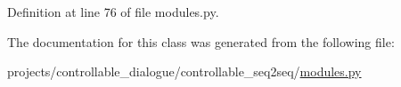 Definition at line 76 of file modules.\+py.



The documentation for this class was generated from the following file\+:\begin{DoxyCompactItemize}
\item 
projects/controllable\+\_\+dialogue/controllable\+\_\+seq2seq/\hyperlink{projects_2controllable__dialogue_2controllable__seq2seq_2modules_8py}{modules.\+py}\end{DoxyCompactItemize}
